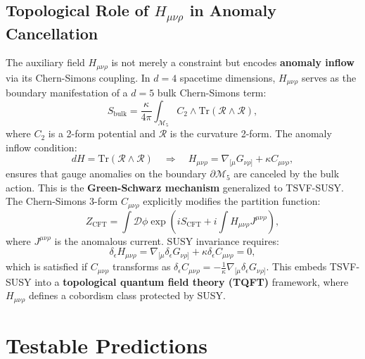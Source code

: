 \documentclass[12pt, onecolumn]{article}
\theoremstyle{definition}
\numberwithin{equation}{section}
\begin{document}
\subsection{Topological Role of \texorpdfstring{$H_{\mu\nu\rho}$}{Topological Role of H} in Anomaly Cancellation}

The auxiliary field \(H_{\mu\nu\rho}\) is not merely a constraint but encodes \textbf{anomaly inflow} via its Chern-Simons coupling. In \(d=4\) spacetime dimensions, \(H_{\mu\nu\rho}\) serves as the boundary manifestation of a \(d=5\) bulk Chern-Simons term:
\begin{equation}
S_{\text{bulk}} = \frac{\kappa}{4\pi} \int_{\mathcal{M}_5} C_2 \wedge \text{Tr}(\mathcal{R} \wedge \mathcal{R}),
\end{equation}
where \(C_2\) is a 2-form potential and \(\mathcal{R}\) is the curvature 2-form. The anomaly inflow condition:
\begin{equation}
dH = \text{Tr}(\mathcal{R} \wedge \mathcal{R}) \quad \Rightarrow \quad H_{\mu\nu\rho} = \nabla_{[\mu} G_{\nu\rho]} + \kappa C_{\mu\nu\rho},
\end{equation}
ensures that gauge anomalies on the boundary \(\partial\mathcal{M}_5\) are canceled by the bulk action. This is the \textbf{Green-Schwarz mechanism} generalized to TSVF-SUSY. The Chern-Simons 3-form \(C_{\mu\nu\rho}\) explicitly modifies the partition function:
\begin{equation}
Z_{\text{CFT}} = \int \mathcal{D}\phi \exp\left(i S_{\text{CFT}} + i \int H_{\mu\nu\rho} J^{\mu\nu\rho}\right),
\end{equation}
where \(J^{\mu\nu\rho}\) is the anomalous current. SUSY invariance requires:
\begin{equation}
\delta_\epsilon H_{\mu\nu\rho} = \nabla_{[\mu} \delta_\epsilon G_{\nu\rho]} + \kappa \delta_\epsilon C_{\mu\nu\rho} = 0,
\end{equation}
which is satisfied if \(C_{\mu\nu\rho}\) transforms as \(\delta_\epsilon C_{\mu\nu\rho} = -\frac{1}{\kappa} \nabla_{[\mu} \delta_\epsilon G_{\nu\rho]}\). This embeds TSVF-SUSY into a \textbf{topological quantum field theory (TQFT)} framework, where \(H_{\mu\nu\rho}\) defines a cobordism class protected by SUSY.

\section{Testable Predictions}
\end{document}
